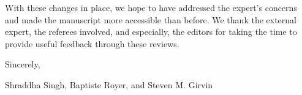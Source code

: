 \documentclass[11pt, letterpaper]{article}
\begin{document}
With these changes in place, we hope to have addressed the expert's concerns and made the manuscript more accessible than before. We thank the external expert, the referees involved, and especially, the editors for taking the time to provide useful feedback through these reviews.

\vspace{12pt}
\noindent
Sincerely,

\vspace{6pt}
\noindent
Shraddha Singh, Baptiste Royer, and Steven M. Girvin
\end{document}

